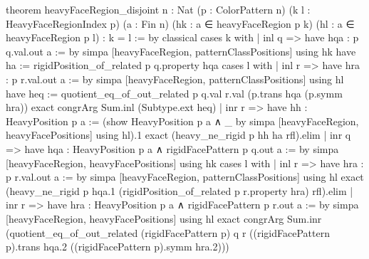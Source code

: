 \documentclass[11pt,reqno]{amsart}
\theoremstyle{definition}
\begin{document}
\begin{LeanCode}
theorem heavyFaceRegion_disjoint {n : Nat} (p : ColorPattern n)
    (k l : HeavyFaceRegionIndex p) (a : Fin n)
    (hk : a ∈ heavyFaceRegion p k) (hl : a ∈ heavyFaceRegion p l) : k = l := by
  classical
  cases k with
  | inl q =>
    have hqa : p q.val.out a := by simpa [heavyFaceRegion, patternClassPositions] using hk
    have ha := rigidPosition_of_related p q.property hqa
    cases l with
    | inl r =>
      have hra : p r.val.out a := by simpa [heavyFaceRegion, patternClassPositions] using hl
      have heq := quotient_eq_of_out_related p q.val r.val (p.trans hqa (p.symm hra))
      exact congrArg Sum.inl (Subtype.ext heq)
    | inr r =>
      have hh : HeavyPosition p a := (show HeavyPosition p a ∧ _ by
        simpa [heavyFaceRegion, heavyFacePositions] using hl).1
      exact (heavy_ne_rigid p hh ha rfl).elim
  | inr q =>
    have hqa : HeavyPosition p a ∧ rigidFacePattern p q.out a := by
      simpa [heavyFaceRegion, heavyFacePositions] using hk
    cases l with
    | inl r =>
      have hra : p r.val.out a := by simpa [heavyFaceRegion, patternClassPositions] using hl
      exact (heavy_ne_rigid p hqa.1 (rigidPosition_of_related p r.property hra) rfl).elim
    | inr r =>
      have hra : HeavyPosition p a ∧ rigidFacePattern p r.out a := by
        simpa [heavyFaceRegion, heavyFacePositions] using hl
      exact congrArg Sum.inr (quotient_eq_of_out_related (rigidFacePattern p) q r
        ((rigidFacePattern p).trans hqa.2 ((rigidFacePattern p).symm hra.2)))


\end{LeanCode}
\end{document}

